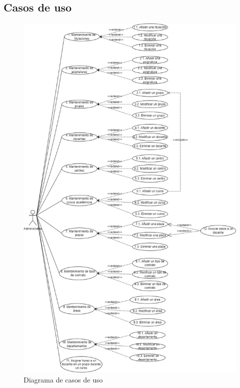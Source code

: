 \subsection{Casos de uso}
\begin{figure}[!h]
	\centering
	\includegraphics[height=0.85\textheight]{../img/Anexos/Casos de uso.jpg}
	\caption{Diagrama de casos de uso}\label{fig:../img/Anexos/Casos de uso.jpg}
\end{figure}

